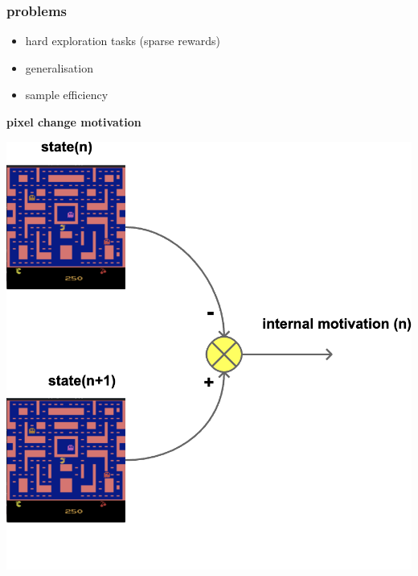 \documentclass{beamer}
\begin{document}
\begin{frame}
  \frametitle{problems} 

  \begin{itemize}
    \item hard exploration tasks (sparse rewards)
    \item generalisation
    \item sample efficiency 
  \end{itemize}

\end{frame}


  \begin{frame}{\bf pixel change motivation}

  \centering
  \includegraphics[scale=0.15]{../diagrams/internal_motivation/pixelchange.png}
  
  \end{frame}
  
\end{document}
